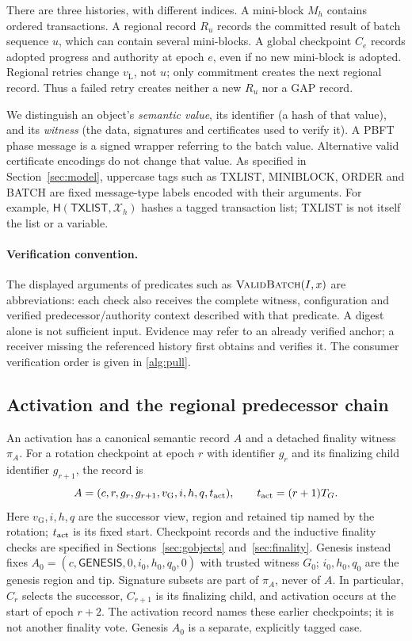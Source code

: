 \documentclass[11pt,a4paper,onecolumn]{article}
\newcommand{\Hash}{\mathsf H}
\newcommand{\gv}{v_{\mathrm G}}
\newcommand{\lv}{v_{\mathrm L}}
\newcommand{\Tag}[1]{\mathsf{#1}}
\newcommand{\Proc}[1]{\textnormal{\textsc{#1}}}
\theoremstyle{remark}\newtheorem{example}[definition]{Example}
\begin{document}
There are three histories, with different indices. A mini-block $M_h$ contains
ordered transactions. A regional record $R_u$ records the committed result of
batch sequence $u$, which can contain several mini-blocks. A global checkpoint
$C_e$ records adopted progress and authority at epoch $e$, even if no new
mini-block is adopted. Regional retries change $\lv$, not $u$; only commitment
creates the next regional record. Thus a failed retry creates neither a new
$R_u$ nor a GAP record.

We distinguish an object's \emph{semantic value}, its identifier (a hash of
that value), and its \emph{witness} (the data, signatures and certificates used
to verify it). A PBFT phase message is a signed wrapper referring to the batch
value. Alternative valid certificate encodings do not change that value.
As specified in Section~\ref{sec:model}, uppercase tags such as TXLIST,
MINIBLOCK, ORDER and BATCH are fixed message-type labels encoded with their
arguments. For example, $\Hash(\Tag{TXLIST},\mathcal X_h)$ hashes a tagged
transaction list; TXLIST is not itself the list or a variable.

\paragraph{Verification convention.}
The displayed arguments of predicates such as $\Proc{ValidBatch}(I,x)$ are
abbreviations: each check also receives the complete witness, configuration
and verified predecessor/authority context described with that predicate.
A digest alone is not sufficient input. Evidence may refer to an already
verified anchor; a receiver missing the referenced history first obtains and
verifies it. The consumer verification order is given in \cref{alg:pull}.

\subsection{Activation and the regional predecessor chain}\label{sec:activationobjects}
An activation has a canonical semantic record $A$ and a detached finality
witness $\pi_A$. For a rotation checkpoint at epoch $r$ with identifier $g_r$
and its finalizing child identifier $g_{r+1}$, the record is
\[
 A=(c,r,g_r,g_{r+1},\gv,i,h,q,t_{\rm act}),\qquad
 t_{\rm act}=(r+1)T_G.
\]
Here $\gv,i,h,q$ are the successor view, region and retained tip named by the
rotation; $t_{\rm act}$ is its fixed start. Checkpoint records and the inductive finality checks are specified in
Sections~\ref{sec:gobjects} and~\ref{sec:finality}. Genesis instead
fixes $A_0=(c,\Tag{GENESIS},0,i_0,h_0,q_0,0)$ with trusted witness $G_0$;
$i_0,h_0,q_0$ are the genesis region and tip. Signature subsets are part of
$\pi_A$, never of $A$. In particular, $C_r$ selects the successor,
$C_{r+1}$ is its finalizing child, and activation occurs at the start of epoch
$r+2$. The activation record names these earlier checkpoints; it is not
another finality vote. Genesis $A_0$ is a separate, explicitly tagged case.
\end{document}
